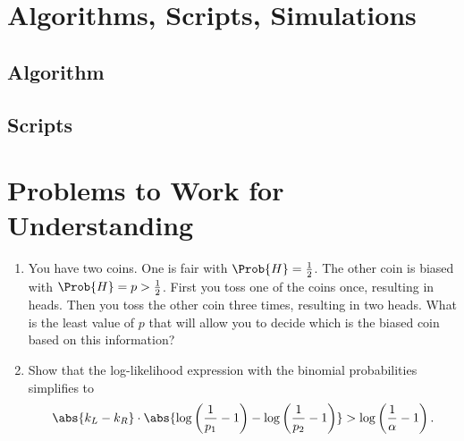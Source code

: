 \documentclass[12pt]{article}
\begin{document}
{\section*{Algorithms, Scripts, Simulations}

\subsection*{Algorithm}

\subsection*{Scripts}



\hr

\section*{Problems to Work for Understanding}
\begin{enumerate}
    \item
        You have two coins.  One is fair with \( \Prob{H} = \frac{1}{2} \).
        The other coin is biased with \( \Prob{H} = p > \frac{1}{2} \).
        First you toss one of the coins once, resulting in heads.  Then
        you toss the other coin three times, resulting in two heads.
        What is the least value of \( p \) that will allow you to decide
        which is the biased coin based on this information?



    \item
        Show that the log-likelihood expression with the binomial
        probabilities simplifies to
        \[
            \abs{k_L - k_R} \cdot \abs{ \log\left( \frac{1}{p_1} - 1
            \right) - \log\left( \frac{1}{p_2} - 1 \right) } > \log
            \left( \frac{1}{\alpha} - 1 \right).
        \]
\end{enumerate}


}
\end{document}
